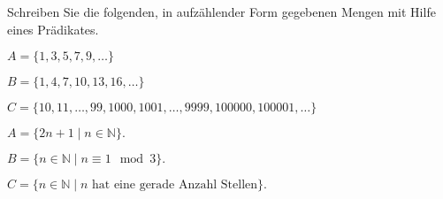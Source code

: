 Schreiben Sie die folgenden, in aufzählender Form gegebenen Mengen mit
Hilfe eines Prädikates.
\begin{teilaufgaben}
\item
$A=\{1,3,5,7,9,\dots\}$
\item
$B=\{1,4,7,10,13,16,\dots\}$
\item
$C=\{10,11,\dots,99,1000,1001,\dots,9999,100000,100001,\dots\}$
\end{teilaufgaben}

\begin{loesung}
\begin{teilaufgaben}
\item
$A=\{2n+1\mid n\in\mathbb{N}\}.$
\item
$B=\{ n\in\mathbb{N}\mid n\equiv 1\mod 3\}.$
\item
$C=\{n\in\mathbb{N}\mid \text{$n$ hat eine gerade Anzahl Stellen}\}.$
\qedhere
\end{teilaufgaben}
\end{loesung}

